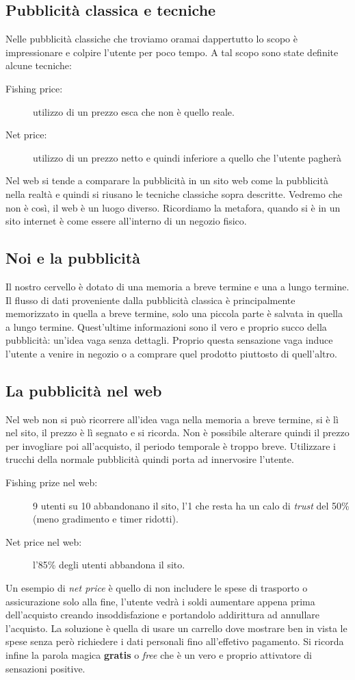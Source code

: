 		\subsection{Pubblicità classica e tecniche}
			Nelle pubblicità classiche che troviamo oramai dappertutto lo scopo è impressionare e colpire l'utente per poco tempo. A tal scopo sono state definite alcune tecniche:
			\begin{description}
				\item[Fishing price:] utilizzo di un prezzo esca che non è quello reale.
				\item[Net price:] utilizzo di un prezzo netto e quindi inferiore a quello che l'utente pagherà
			\end{description}
			Nel web si tende a comparare la pubblicità in un sito web come la pubblicità nella realtà e quindi si riusano le tecniche classiche sopra descritte. Vedremo che non è così, il web è un luogo diverso. Ricordiamo la metafora, quando si è in un sito internet è come essere all'interno di un negozio fisico.
		
		\subsection{Noi e la pubblicità}
			Il nostro cervello è dotato di una memoria a breve termine e una a lungo termine. Il flusso di dati proveniente dalla pubblicità classica è principalmente memorizzato in quella a breve termine, solo una piccola parte è salvata in quella a lungo termine. Quest'ultime informazioni sono il vero e proprio succo della pubblicità: un'idea vaga senza dettagli. Proprio questa sensazione vaga induce l'utente a venire in negozio o a comprare quel prodotto piuttosto di quell'altro.
		
		\subsection{La pubblicità nel web}
			Nel web non si può ricorrere all'idea vaga nella memoria a breve termine, si è lì nel sito, il prezzo è lì segnato e si ricorda. Non è possibile alterare quindi il prezzo per invogliare poi all'acquisto, il periodo temporale è troppo breve. Utilizzare i trucchi della normale pubblicità 		 quindi porta ad innervosire l'utente.
			\begin{description}
				\item[Fishing prize nel web:] 9 utenti su 10 abbandonano il sito, l'1 che resta ha un calo di \emph{trust} del 50\% (meno gradimento e timer ridotti).
				\item[Net price nel web:] l'85\% degli utenti abbandona il sito. 
			\end{description}
			Un esempio di \emph{net price} è quello di non includere le spese di trasporto o assicurazione solo alla fine, l'utente vedrà i soldi aumentare appena prima dell'acquisto creando insoddisfazione e portandolo addirittura ad annullare l'acquisto. La soluzione è quella di usare un carrello dove mostrare ben in vista le spese senza però richiedere i dati personali fino all'effetivo pagamento.
			Si ricorda infine la parola magica \textbf{gratis} o \emph{free} che è un vero e proprio attivatore di sensazioni positive.
			
